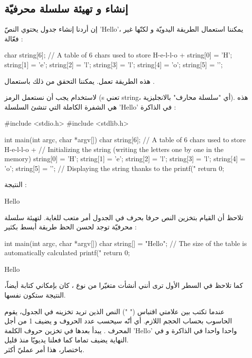 \subsection{إنشاء و تهيئة سلسلة محرفيّة}
إن أردنا إنشاء جدول
يحتوي النصّ
'\textenglish{Hello}'،
يمكننا استعمال الطريقة اليدويّة و لكنّها غير فعّالة :
\begin{Csource}
char string[6]; // A table of  6 chars used to store H-e-l-l-o + \0
string[0] = 'H';
string[1] = 'e';
string[2] = 'l';
string[3] = 'l';
string[4] = 'o';
string[5] = '\0';
\end{Csource}
هذه الطريقة تعمل. يمكننا التحقق من ذلك باستعمال
.

لاستخدام
يجب أن نستعمل الرمز
(\textenglish{s}
تعني
\textenglish{string}،
أي "سلسلة محارف" بالانجليزية). هذه هي الشفرة الكاملة التي تنشئ السلسلة
'\textenglish{Hello}'
في الذاكرة :
\begin{Csource}
#include <stdio.h>
#include <stdlib.h>

int main(int argc, char *argv[])
{
	char string[6]; // A table of 6 chars used to store H-e-l-l-o + \0
	// Initializing the string (writing the letters one by one in the memory)
	string[0] = 'H';
	string[1] = 'e';
	string[2] = 'l';
	string[3] = 'l';
	string[4] = 'o';
	string[5] = '\0';
	// Displaying the string thanks to the %
	printf("%
	return 0;
}
\end{Csource}
النتيجة :
\begin{Console}
Hello
\end{Console}
تلاحظ أن القيام بتخزين النص حرفا بحرف في الجدول
أمر متعب للغاية. لتهيئة سلسلة محرفيّة توجد لحسن الحظ  طريقة أبسط بكثير :
\begin{Csource}
int main(int argc, char *argv[])
{
	char string[] = "Hello"; // The size of the table is automatically calculated
	printf("%
	return 0;
}
\end{Csource}
\begin{Console}
Hello
\end{Console}
كما تلاحظ في السطر الأول ترى أنني أنشأت متغيّرا من نوع
،
كان بإمكاني كتابة
أيضاً، النتيجة ستكون نفسها.

عندما تكتب بين علامتي اقتباس (" ") النص الذين تريد تخزينه في الجدول، يقوم الحاسوب بحساب الحجم اللازم. أي أنّه سيحسب عدد الحروف و يضيف 1 من أجل المحرف
.
يبدأ بعدها في تخزين حروف الكلمة
'\textenglish{Hello}'
واحدا واحدا في الذاكرة و في النهاية يضيف
تماما كما فعلنا يديويّا منذ قليل.\\
باختصار، هذا أمر عمليّ أكثر.

